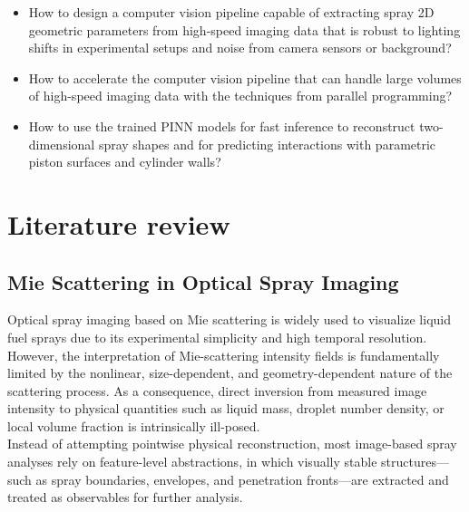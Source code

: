 \documentclass[english, 12pt, a4paper, elec, utf8, a-2b, online]{aaltothesis}
\begin{document}
\begin{itemize}

    \item[--] How to design a computer vision pipeline capable of extracting spray 2D geometric parameters from high-speed imaging data that is robust to lighting shifts in experimental setups and noise from camera sensors or background?

    \item[--] How to accelerate the computer vision pipeline that can handle large volumes of high-speed imaging data with the techniques from parallel programming?

    \item[--] How to use the trained PINN models for fast inference to reconstruct two-dimensional spray shapes and for predicting interactions with parametric piston surfaces and cylinder walls?

    

\end{itemize}

\clearpage

\section{Literature review}

\subsection{Mie Scattering in Optical Spray Imaging}

Optical spray imaging based on Mie scattering is widely used to visualize liquid fuel sprays due to its experimental simplicity and high temporal resolution. However, the interpretation of Mie-scattering intensity fields is fundamentally limited by the nonlinear, size-dependent, and geometry-dependent nature of the scattering process. As a consequence, direct inversion from measured image intensity to physical quantities such as liquid mass, droplet number density, or local volume fraction is intrinsically ill-posed.\\

Instead of attempting pointwise physical reconstruction, most image-based spray analyses rely on feature-level abstractions, in which visually stable structures—such as spray boundaries, envelopes, and penetration fronts—are extracted and treated as observables for further analysis.\\
\end{document}
